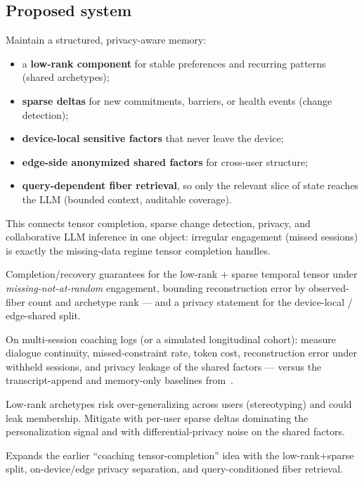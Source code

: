 \documentclass[11pt]{article}
\begin{document}
\subsection*{Proposed system}
Maintain a structured, privacy-aware memory:
\begin{itemize}[leftmargin=1.5em,nosep]
\item a \textbf{low-rank component} for stable preferences and recurring patterns (shared archetypes);
\item \textbf{sparse deltas} for new commitments, barriers, or health events (change detection);
\item \textbf{device-local sensitive factors} that never leave the device;
\item \textbf{edge-side anonymized shared factors} for cross-user structure;
\item \textbf{query-dependent fiber retrieval}, so only the relevant slice of state reaches the LLM (bounded context, auditable coverage).
\end{itemize}
This connects tensor completion, sparse change detection, privacy, and collaborative LLM
inference in one object: irregular engagement (missed sessions) is exactly the missing-data
regime tensor completion handles.

\begin{theorybox}
Completion/recovery guarantees for the low-rank $+$ sparse temporal tensor under
\emph{missing-not-at-random} engagement, bounding reconstruction error by observed-fiber
count and archetype rank --- and a privacy statement for the device-local / edge-shared split.
\end{theorybox}

\begin{expbox}
On multi-session coaching logs (or a simulated longitudinal cohort): measure dialogue
continuity, missed-constraint rate, token cost, reconstruction error under withheld
sessions, and privacy leakage of the shared factors --- versus the transcript-append and
memory-only baselines from~\cite{coaching}.
\end{expbox}

\begin{riskbox}
Low-rank archetypes risk over-generalizing across users (stereotyping) and could leak
membership. Mitigate with per-user sparse deltas dominating the personalization signal and
with differential-privacy noise on the shared factors.
\end{riskbox}

\begin{buildbox}
Expands the earlier ``coaching tensor-completion'' idea with the low-rank$+$sparse split,
on-device/edge privacy separation, and query-conditioned fiber retrieval.
\end{buildbox}
\end{document}
